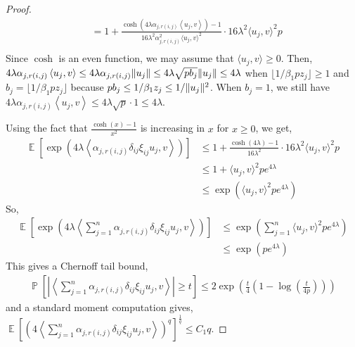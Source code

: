\documentclass[11pt]{amsart}
\numberwithin{equation}{section}
\numberwithin{equation}{section}
\DeclareMathOperator{\E}{\mathbb{E}}
\DeclareMathOperator{\Pb}{\mathbb{P}}
\DeclarePairedDelimiter{\norm}{\lVert}{\rVert}
\theoremstyle{remark}
\theoremstyle{definition}
\begin{document}
\begin{proof}
\begin{align*}
        &= 1 + \frac{\cosh\left(  4\lambda\alpha_{j,r(i,j)} \left\langle  u_{j}, v \right\rangle \right) - 1}{16\lambda^2\alpha^2_{j,r(i,j)}\langle  u_{j}, v \rangle^2} \cdot 16\lambda^2 \langle  u_{j}, v \rangle^2 p \\ 
    \end{align*}
    Since $\cosh$ is an even function, we may assume that $\langle  u_{j}, v \rangle \ge 0$. Then, $4\lambda \alpha_{j,r(i,j)} \left\langle  u_{j}, v \right\rangle  \le 4\lambda \alpha_{j,r(i,j)} \norm{u_j} \le 4\lambda \sqrt{pb_j} \norm{u_j} \le 4\lambda$ when $\lfloor 1/\beta_1pz_j \rfloor \ge 1$ and $b_j = \lfloor 1/\beta_1pz_j \rfloor$ because $pb_j \le 1/\beta_1z_j \le 1/\norm{u_j}^2$.
    When $b_j=1$, we still have $4\lambda \alpha_{j,r(i,j)} \left\langle  u_{j}, v \right\rangle   \le 4\lambda \sqrt{p} \cdot 1 \le 4\lambda$.
    
    Using the fact that $\frac{\cosh(x)-1}{x^2}$ is increasing in $x$ for $x \ge 0$, we get,
    \begin{align*}
        \E \left[ \exp \left(4\lambda \left\langle \alpha_{j,r(i,j)} \delta_{ij} \xi_{ij} u_{j}, v \right\rangle \right) \right] &\le 1 + \frac{\cosh(4\lambda)-1}{16\lambda^2} \cdot 16\lambda^2 \langle  u_{j}, v \rangle^2 p \\
        &\le 1 + \langle  u_{j}, v \rangle^2 p e^{4\lambda} \\
        &\le \exp( \langle  u_{j}, v \rangle^2 p e^{4\lambda} )
    \end{align*}
    So,
    \begin{align*}
        \E \left[ \exp \left(4\lambda \left\langle \sum_{j=1}^n\alpha_{j,r(i,j)} \delta_{ij} \xi_{ij} u_{j}, v \right\rangle \right) \right] 
        &\le \exp \left( \sum_{j=1}^n \langle  u_{j}, v \rangle^2 p e^{4\lambda} \right) \\
        &\le \exp(p e^{4\lambda})
    \end{align*}
    This gives a Chernoff tail bound,
    \begin{align*}
        \Pb \left[ \left\lvert \left\langle \sum_{j=1}^n\alpha_{j,r(i,j)} \delta_{ij} \xi_{ij} u_{j}, v \right\rangle \right\rvert \ge t \right] \le 2\exp \left( \frac{t}{4} \left( 1 - \log \left( \frac{t}{4p} \right) \right) \right)
    \end{align*}
    and a standard moment computation gives, $\E \left[ \left( 4 \left\langle \sum_{j=1}^n \alpha_{j,r(i,j)}\delta_{ij} \xi_{ij} u_{j}, v \right\rangle  \right)^q \right]^\frac{1}{q} \le C_1 q $.


\end{proof}
\end{document}
